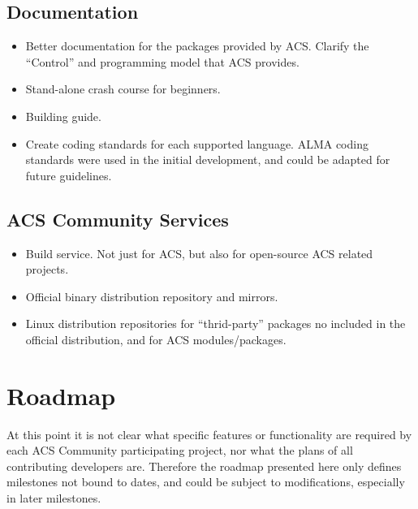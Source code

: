 \documentclass[letterpaper,11pt,twosided]{article}
\begin{document}
\subsection{Documentation}
\begin{itemize}
\item Better documentation for the packages provided by ACS. Clarify the ``Control'' and programming model that ACS provides.
\item Stand-alone crash course for beginners.
\item Building guide.
\item Create coding standards for each supported language. ALMA coding standards were used in the initial development, and could be adapted for future guidelines.
\end{itemize}

\subsection{ACS Community Services}
\begin{itemize}
\item Build service. Not just for ACS, but also for open-source ACS related projects.
\item Official binary distribution repository and mirrors.
\item Linux distribution repositories for ``thrid-party'' packages no included in the official distribution, and for ACS modules/packages.
\end{itemize}

\section{Roadmap}
At this point it is not clear what specific features or functionality are required by each ACS Community participating project, nor what the plans of all contributing developers are. Therefore the roadmap presented here only defines milestones not bound to dates, and could be subject to modifications, especially in later milestones.
\end{document}
